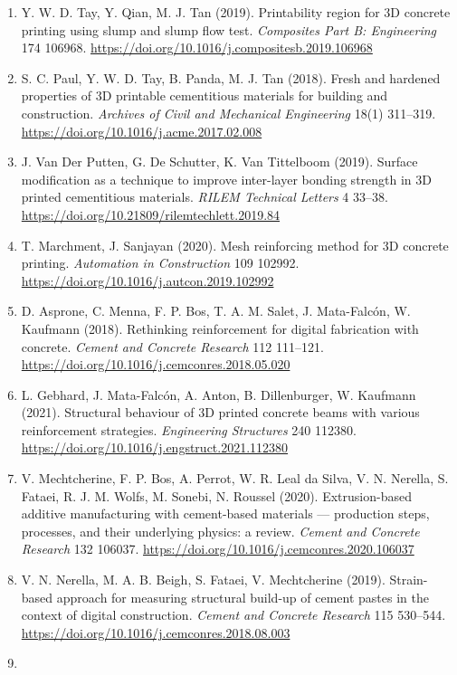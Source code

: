 \documentclass[
  11pt,
  letterpaper,
]{article}
\begin{document}
\begin{enumerate}
\item
  Y. W. D. Tay, Y. Qian, M. J. Tan (2019). Printability region for 3D
  concrete printing using slump and slump flow test. \emph{Composites
  Part B: Engineering} 174 106968.
  \url{https://doi.org/10.1016/j.compositesb.2019.106968}
\item
  S. C. Paul, Y. W. D. Tay, B. Panda, M. J. Tan (2018). Fresh and
  hardened properties of 3D printable cementitious materials for
  building and construction. \emph{Archives of Civil and Mechanical
  Engineering} 18(1) 311--319.
  \url{https://doi.org/10.1016/j.acme.2017.02.008}
\item
  J. Van Der Putten, G. De Schutter, K. Van Tittelboom (2019). Surface
  modification as a technique to improve inter-layer bonding strength in
  3D printed cementitious materials. \emph{RILEM Technical Letters} 4
  33--38. \url{https://doi.org/10.21809/rilemtechlett.2019.84}
\item
  T. Marchment, J. Sanjayan (2020). Mesh reinforcing method for 3D
  concrete printing. \emph{Automation in Construction} 109 102992.
  \url{https://doi.org/10.1016/j.autcon.2019.102992}
\item
  D. Asprone, C. Menna, F. P. Bos, T. A. M. Salet, J. Mata-Falcón, W.
  Kaufmann (2018). Rethinking reinforcement for digital fabrication with
  concrete. \emph{Cement and Concrete Research} 112 111--121.
  \url{https://doi.org/10.1016/j.cemconres.2018.05.020}
\item
  L. Gebhard, J. Mata-Falcón, A. Anton, B. Dillenburger, W. Kaufmann
  (2021). Structural behaviour of 3D printed concrete beams with various
  reinforcement strategies. \emph{Engineering Structures} 240 112380.
  \url{https://doi.org/10.1016/j.engstruct.2021.112380}
\item
  V. Mechtcherine, F. P. Bos, A. Perrot, W. R. Leal da Silva, V. N.
  Nerella, S. Fataei, R. J. M. Wolfs, M. Sonebi, N. Roussel (2020).
  Extrusion-based additive manufacturing with cement-based materials ---
  production steps, processes, and their underlying physics: a review.
  \emph{Cement and Concrete Research} 132 106037.
  \url{https://doi.org/10.1016/j.cemconres.2020.106037}
\item
  V. N. Nerella, M. A. B. Beigh, S. Fataei, V. Mechtcherine (2019).
  Strain-based approach for measuring structural build-up of cement
  pastes in the context of digital construction. \emph{Cement and
  Concrete Research} 115 530--544.
  \url{https://doi.org/10.1016/j.cemconres.2018.08.003}
\item

\end{enumerate}
\end{document}
